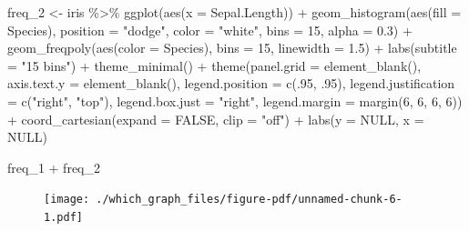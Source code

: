 \documentclass[
  letterpaper,
]{book}
\newenvironment{Shaded}{\begin{snugshade}}{\end{snugshade}}
\newcommand{\AttributeTok}[1]{\textcolor[rgb]{0.40,0.45,0.13}{#1}}
\newcommand{\ConstantTok}[1]{\textcolor[rgb]{0.56,0.35,0.01}{#1}}
\newcommand{\DecValTok}[1]{\textcolor[rgb]{0.68,0.00,0.00}{#1}}
\newcommand{\FloatTok}[1]{\textcolor[rgb]{0.68,0.00,0.00}{#1}}
\newcommand{\FunctionTok}[1]{\textcolor[rgb]{0.28,0.35,0.67}{#1}}
\newcommand{\NormalTok}[1]{\textcolor[rgb]{0.00,0.23,0.31}{#1}}
\newcommand{\OtherTok}[1]{\textcolor[rgb]{0.00,0.23,0.31}{#1}}
\newcommand{\SpecialCharTok}[1]{\textcolor[rgb]{0.37,0.37,0.37}{#1}}
\newcommand{\StringTok}[1]{\textcolor[rgb]{0.13,0.47,0.30}{#1}}
\begin{document}
\begin{Shaded}
\begin{Highlighting}[]
\NormalTok{freq\_2 }\OtherTok{\textless{}{-}}\NormalTok{ iris }\SpecialCharTok{\%\textgreater{}\%} \FunctionTok{ggplot}\NormalTok{(}\FunctionTok{aes}\NormalTok{(}\AttributeTok{x =}\NormalTok{ Sepal.Length))   }\SpecialCharTok{+} 
  \FunctionTok{geom\_histogram}\NormalTok{(}\FunctionTok{aes}\NormalTok{(}\AttributeTok{fill =}\NormalTok{ Species), }\AttributeTok{position =} \StringTok{"dodge"}\NormalTok{, }\AttributeTok{color =} \StringTok{"white"}\NormalTok{, }\AttributeTok{bins =} \DecValTok{15}\NormalTok{, }\AttributeTok{alpha =} \FloatTok{0.3}\NormalTok{) }\SpecialCharTok{+} 
  \FunctionTok{geom\_freqpoly}\NormalTok{(}\FunctionTok{aes}\NormalTok{(}\AttributeTok{color =}\NormalTok{ Species), }\AttributeTok{bins =} \DecValTok{15}\NormalTok{, }\AttributeTok{linewidth =} \FloatTok{1.5}\NormalTok{) }\SpecialCharTok{+} \FunctionTok{labs}\NormalTok{(}\AttributeTok{subtitle =} \StringTok{"15 bins"}\NormalTok{) }\SpecialCharTok{+} 
  \FunctionTok{theme\_minimal}\NormalTok{() }\SpecialCharTok{+} 
  \FunctionTok{theme}\NormalTok{(}\AttributeTok{panel.grid =} \FunctionTok{element\_blank}\NormalTok{(), }\AttributeTok{axis.text.y =} \FunctionTok{element\_blank}\NormalTok{(),}
         \AttributeTok{legend.position =} \FunctionTok{c}\NormalTok{(.}\DecValTok{95}\NormalTok{, .}\DecValTok{95}\NormalTok{),}
    \AttributeTok{legend.justification =} \FunctionTok{c}\NormalTok{(}\StringTok{"right"}\NormalTok{, }\StringTok{"top"}\NormalTok{),}
    \AttributeTok{legend.box.just =} \StringTok{"right"}\NormalTok{,}
    \AttributeTok{legend.margin =} \FunctionTok{margin}\NormalTok{(}\DecValTok{6}\NormalTok{, }\DecValTok{6}\NormalTok{, }\DecValTok{6}\NormalTok{, }\DecValTok{6}\NormalTok{)) }\SpecialCharTok{+} 
  \FunctionTok{coord\_cartesian}\NormalTok{(}\AttributeTok{expand =} \ConstantTok{FALSE}\NormalTok{, }\AttributeTok{clip =} \StringTok{"off"}\NormalTok{) }\SpecialCharTok{+} 
  \FunctionTok{labs}\NormalTok{(}\AttributeTok{y =} \ConstantTok{NULL}\NormalTok{, }\AttributeTok{x =} \ConstantTok{NULL}\NormalTok{)  }

\NormalTok{freq\_1 }\SpecialCharTok{+}\NormalTok{ freq\_2}
\end{Highlighting}
\end{Shaded}

\begin{figure}[H]

{\centering \texttt{[image: ./which\_graph\_files/figure-pdf/unnamed-chunk-6-1.pdf]}

}

\end{figure}
\end{document}
